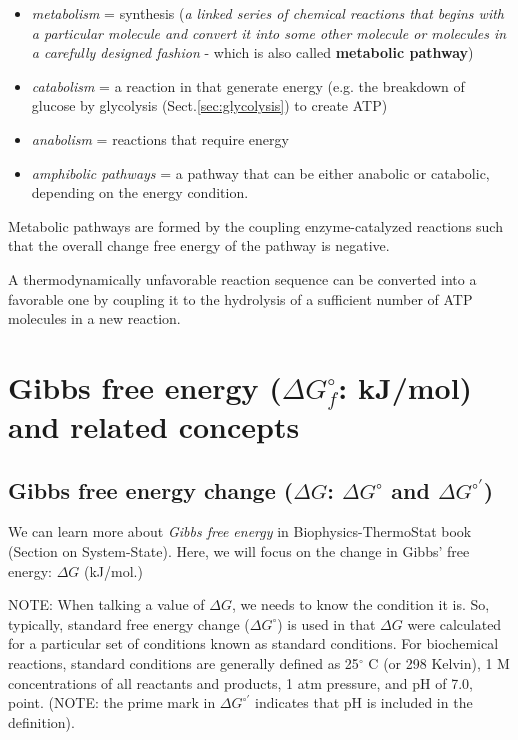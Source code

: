\begin{itemize}

\item {\it metabolism} = synthesis
  ({\it a linked series of chemical reactions that begins with a
    particular molecule and convert it into some other molecule or
    molecules in a carefully designed fashion}
  - which is also called {\bf metabolic pathway})

\label{sec:catabolism}
\item {\it catabolism} = a reaction in that generate energy
(e.g. the breakdown of glucose by glycolysis (Sect.\ref{sec:glycolysis}) to
create ATP)

\label{sec:anabolism}
\item {\it anabolism} = reactions that require energy

\item {\it amphibolic pathways} = a pathway that can be either
  anabolic or catabolic, depending on the energy condition.
  

\end{itemize}

\begin{framed}

  Metabolic pathways are formed by the coupling enzyme-catalyzed
  reactions such that the overall change free energy of the pathway is
  negative.

  A thermodynamically unfavorable reaction sequence can be converted
  into a favorable one by coupling it to the hydrolysis of a
  sufficient number of ATP molecules in a new reaction.
\end{framed}

\section{Gibbs free energy ($\Delta G_f^\circ$: kJ/mol) and related concepts}

\subsection{Gibbs free energy change ($\Delta
G$: $\Delta G^{\circ}$ and $\Delta G^{\circ'}$)}
\label{sec:Gibbs-free-energy}

We can learn more about {\it Gibbs free energy} in Biophysics-ThermoStat book
(Section on System-State).
Here, we will focus on the change in Gibbs' free energy: $\Delta G$ (kJ/mol.)

NOTE: When talking a value of $\Delta G$, we needs to know the condition it is.
So, typically, standard free energy change ($\Delta G^\circ$) is used in that
$\Delta G$ were calculated for a particular set of conditions known as standard
conditions. For biochemical reactions, standard conditions are generally defined
as 25$^\circ$ C (or 298 Kelvin), 1 M concentrations of all reactants and
products, 1 atm pressure, and pH of 7.0, point.
(NOTE: the prime mark in $\Delta G^{\circ'}$ indicates that pH is included in
the definition).

